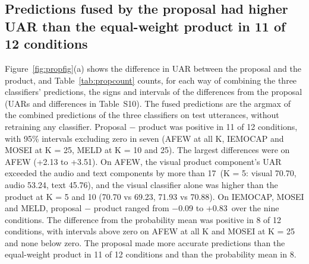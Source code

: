 \subsection{Predictions fused by the proposal had higher UAR than the equal-weight product in 11 of 12 conditions}\label{sec:res-prop}
Figure~\ref{fig:propfig}(a) shows the difference in UAR between the proposal and the product, and Table~\ref{tab:propcount} counts, for each way of combining the three classifiers' predictions, the signs and intervals of the differences from the proposal (UARs and differences in Table~S10). The fused predictions are the argmax of the combined predictions of the three classifiers on test utterances, without retraining any classifier. Proposal $-$ product was positive in 11 of 12 conditions, with 95\% intervals excluding zero in seven (AFEW at all K, IEMOCAP and MOSEI at K = 25, MELD at K = 10 and 25). The largest differences were on AFEW (+2.13 to +3.51\pt). On AFEW, the visual product component's UAR exceeded the audio and text components by more than 17\pt\ (K = 5: visual 70.70, audio 53.24, text 45.76), and the visual classifier alone was higher than the product at K = 5 and 10 (70.70 vs 69.23, 71.93 vs 70.88). On IEMOCAP, MOSEI and MELD, proposal $-$ product ranged from $-$0.09 to +0.83\pt\ over the nine conditions. The difference from the probability mean was positive in 8 of 12 conditions, with intervals above zero on AFEW at all K and MOSEI at K = 25 and none below zero. The proposal made more accurate predictions than the equal-weight product in 11 of 12 conditions and than the probability mean in 8.

